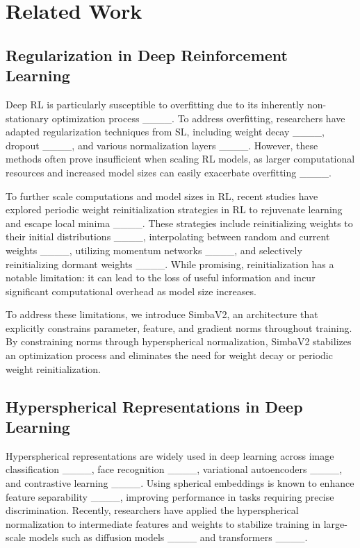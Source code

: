 \section{Related Work}
\subsection{Regularization in Deep Reinforcement Learning}

Deep RL is particularly susceptible to overfitting due to its inherently non-stationary optimization process ____. To address overfitting, researchers have adapted regularization techniques from SL, including weight decay ____, dropout ____, and various normalization layers ____. However, these methods often prove insufficient when scaling RL models, as larger computational resources and increased model sizes can easily exacerbate overfitting ____.

To further scale computations and model sizes in RL, recent studies have explored periodic weight reinitialization strategies in RL to rejuvenate learning and escape local minima ____. 
These strategies include reinitializing weights to their initial distributions ____, interpolating between random and current weights ____, utilizing momentum networks ____, and selectively reinitializing dormant weights ____. 
While promising, reinitialization has a notable limitation: it can lead to the loss of useful information and incur significant computational overhead as model size increases.

To address these limitations, we introduce SimbaV2, an architecture that explicitly constrains parameter, feature, and gradient norms throughout training. By constraining norms through hyperspherical normalization, SimbaV2 stabilizes an optimization process and eliminates the need for weight decay or periodic weight reinitialization.


\subsection{Hyperspherical Representations in Deep Learning}

Hyperspherical representations are widely used in deep learning across image classification ____, face recognition ____, variational autoencoders ____, and contrastive learning ____. Using spherical embeddings is known to enhance feature separability ____, improving performance in tasks requiring precise discrimination. Recently, researchers have applied the hyperspherical normalization to intermediate features and weights to stabilize training in large-scale models such as diffusion models ____ and transformers ____.

